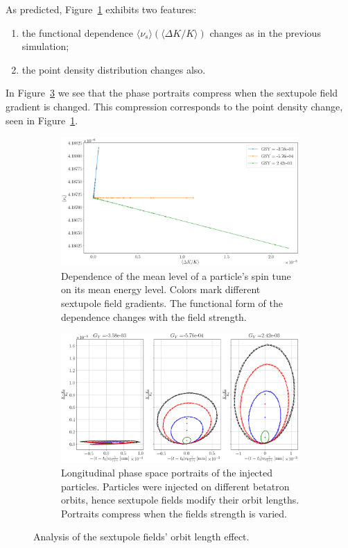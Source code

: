 \documentclass[preprint, review]{elsarticle}
\newcommand{\D}{\Delta}
\newcommand{\avg}[1]{\langle{#1}\rangle}
\begin{document}
As predicted, Figure~\ref{fig:sext:OL_effect} exhibits two features:
\begin{enumerate}[(1)]
\item the functional dependence $\avg{\nu_s}(\avg{\D K/K})$ changes as in the previous simulation;
\item the point density distribution changes also.
\end{enumerate}

In Figure~\ref{fig:sext:OL_effect:LPS} we see that the phase portraits compress when the sextupole field gradient
is changed. This compression corresponds to the point density change, seen in Figure~\ref{fig:sext:OL_effect}.
\begin{figure}[h]\centering
  \begin{subfigure}{\linewidth}
    \includegraphics[width=\linewidth]{img/decoh/STDK_3SS_Y}
    \caption{Dependence of the mean level of a particle's spin tune on its mean energy level.
      Colors mark different sextupole field gradients.
      The functional form of the dependence changes with the field strength.\label{fig:sext:OL_effect}}
  \end{subfigure}
  \begin{subfigure}{\linewidth}
    \includegraphics[width=\linewidth]{img/decoh/LPS_3SS_Y}
    \caption{Longitudinal phase space portraits of the injected particles.
      Particles were injected on different betatron orbits, hence sextupole fields modify their orbit lengths.
      Portraits compress when the fields strength is varied.\label{fig:sext:OL_effect:LPS}}
  \end{subfigure}
  \caption{Analysis of the sextupole fields' orbit length effect.}
\end{figure}
\end{document}
